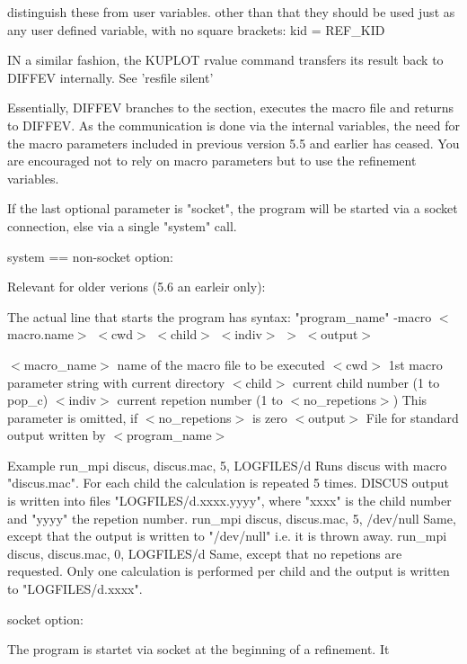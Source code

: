distinguish these from user variables. other than that they should be 
used just as any user defined variable, with no square brackets: 
kid = REF\_KID 
\par
IN a similar fashion, the KUPLOT rvalue command transfers its 
result back to DIFFEV internally. See 'resfile silent' 
\par
Essentially, DIFFEV branches to the section, executes the macro file 
and returns to DIFFEV. As the communication is done via the internal 
variables, the need for the macro parameters included in previous 
version 5.5 and earlier has ceased. You are encouraged not to rely 
on macro parameters but to use the refinement variables. 
\par
\par
If the last optional parameter is "socket", the program will be 
started via a socket connection, else via a single "system" call. 
\par
system == non-socket option: 
\par
Relevant for older verions (5.6 an earleir only): 
\par
The actual line that starts the program has syntax: 
"program\_name" -macro $ <$macro.name$> $ $ <$cwd$> $ $ <$child$> $ $ <$indiv$> $ $> $ $ <$output$> $ 
\par
$ <$macro\_name$> $ name of the macro file to be executed 
$ <$cwd$> $        1st macro parameter string with current directory 
$ <$child$> $      current child number (1 to pop\_c) 
$ <$indiv$> $      current repetion number (1 to $ <$no\_repetions$> $) 
             This parameter is omitted, if $ <$no\_repetions$> $ is zero 
$ <$output$> $     File for standard output written by $ <$program\_name$> $ 
\par
Example 
run\_mpi discus, discus.mac, 5, LOGFILES/d 
        Runs discus with macro "discus.mac". For each child the 
        calculation is repeated 5 times. DISCUS output is written 
        into files "LOGFILES/d.xxxx.yyyy", where "xxxx" is the 
        child number and "yyyy" the repetion number. 
run\_mpi discus, discus.mac, 5, /dev/null 
        Same, except that the output is written to "/dev/null" 
        i.e. it is thrown away. 
run\_mpi discus, discus.mac, 0, LOGFILES/d 
        Same, except that no repetions are requested. Only one 
        calculation is performed per child and the output is 
        written to "LOGFILES/d.xxxx". 
\par
socket option: 
\par
The program is startet via socket at the beginning of a refinement. It 
